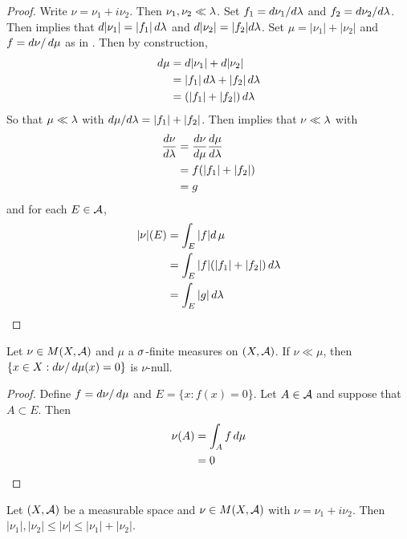 \documentclass{book}
\begin{document}
	\begin{proof}
	Write $\nu = \nu_1 + i \nu_2$. Then $\nu_1, \nu_2 \ll \lambda$. Set $f_1 = d\nu_1 / d\lambda$ and $f_2 = d\nu_2 / d\lambda$. Then  implies that $d|\nu_1| = |f_1| \, d \lambda$ and $d|\nu_2| = |f_2|d\lambda$. Set $\mu = |\nu_1| + |\nu_2|$ and $f = d\nu / \, d \mu$ as in . Then by construction, 
	\begin{align*}
	d\mu
	&= d|\nu_1| + d|\nu_2| \\
	&= |f_1| \, d \lambda + |f_2| \, d \lambda \\
	&= (|f_1| + |f_2|) \, d \lambda
	\end{align*}
	So that $\mu \ll \lambda$ with $d\mu / d \lambda = |f_1| + |f_2|$. Then  implies that $\nu \ll \lambda$ with 
	\begin{align*}
	\frac{d\nu}{d\lambda} 
	&= \frac{d\nu}{d\mu} \frac{d\mu}{d\lambda}\\
	&= f(|f_1|+|f_2|) \\
	&= g
	\end{align*}
	and for each $E \in \mathcal{A}$, 
	\begin{align*}
	|\nu|(E) 
	&= \int_E |f| d \, \mu \\
	&= \int_E |f| (|f_1| + |f_2|) \, d\lambda \\
	&= \int_E|g| \, d\lambda 
	\end{align*}
	\end{proof}
	
	\begin{ex}  
		Let $\nu \in M(X, \mathcal{A})$ and $\mu$ a $\sigma$-finite measures on $(X,\mathcal{A})$. If $\nu \ll \mu$, then $\{x \in X: d\nu / \, d \mu(x) = 0 \}$ is $\nu$-null.
	\end{ex}
	
	\begin{proof}
		Define $f = d\nu / \, d \mu$ and $E = \{x: f(x) = 0\}$. Let $A \in \mathcal{A}$ and suppose that $A \subset E$. Then 
		\begin{align*}
			\nu(A) 
			&= \int_A f \, d \mu\\
			&= 0
		\end{align*} 
	\end{proof}
	
	\begin{ex}  
		Let $(X, \mathcal{A})$ be a measurable space and $\nu \in M(X, \mathcal{A})$ with $\nu = \nu_1 + i\nu_2$. Then $|\nu_1|, |\nu_2| \leq |\nu| \leq |\nu_1| + |\nu_2|$.
		
	\end{ex}
	
\end{document}
